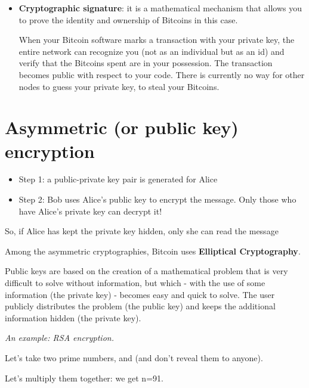 
\begin{itemize}
	\item \textbf{Cryptographic signature}: it is a mathematical mechanism that allows you to prove the identity and ownership of Bitcoins in this case.
	      
	      When your Bitcoin software marks a transaction with your private key, the entire network can recognize you (not as an individual but as an id) and verify that the Bitcoins spent are in your possession. The transaction becomes public with respect to your code. There is currently no way for other nodes to guess your private key, to steal your Bitcoins.
\end{itemize}


\section{Asymmetric (or public key) encryption}
\begin{itemize}
	\item Step 1: a public-private key pair is generated for Alice
	\item Step 2: Bob uses Alice's public key to encrypt the message. Only those who have Alice's private key can decrypt it!
\end{itemize}

So, if Alice has kept the private key hidden, only she can read the message


Among the asymmetric cryptographies, Bitcoin uses \textbf{Elliptical Cryptography}.

Public keys are based on the creation of a mathematical problem that is very difficult to solve without information, but which - with the use of some information (the private key) - becomes easy and quick to solve. The user publicly distributes the problem (the public key) and keeps the additional information hidden (the private key).

\textit{An example: RSA encryption.}

Let's take two prime numbers, {} and {} (and don't reveal them to anyone).

Let's multiply them together: we get {\selectfont n=91}.

